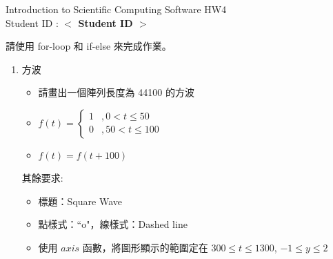 \documentclass[12pt,a4paper]{article}
\newcommand{\placeholder}[1]{\textbf{$<$ #1 $>$}}
\newcommand{\idnumber}{\placeholder{Student ID}}
\begin{document}
\begin{CJK}{UTF8}{bsmi}
\begin{flushleft}Introduction to Scientific Computing Software HW4
\\Student ID : \idnumber{}\end{flushleft}

請使用 for-loop 和 if-else 來完成作業。
\begin{enumerate}
\item 方波
\begin{itemize} 
\item 請畫出一個陣列長度為 44100 的方波

\item $f(t)=\left\{\begin{array}{lc}1&,0 < t\le50 \\ 0 &,50 < t \le 100\end{array}\right.$
\item $f(t)=f(t+100)$
\end{itemize}
其餘要求:
\begin{itemize}
\item 標題：Square Wave
\item 點樣式：``o"，線樣式：Dashed line
\item 使用 $axis$ 函數，將圖形顯示的範圍定在 $300 \le t \le 1300$, $-1\le y \le 2$
\end{itemize}
\end{enumerate}
\end{CJK}
\end{document}
